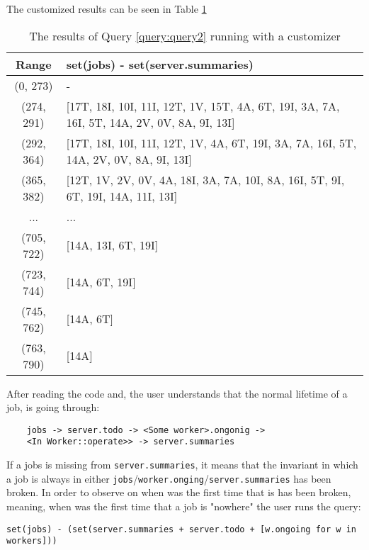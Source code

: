 \documentclass[sigconf,review]{acmart}
\begin{document}
    The customized results can be seen in Table \ref{tab:q2rescus}

    \begin{table}[h]
        \centering
        \begin{tabular}{|c|p{5cm}|}
            \hline
            \textbf{Range} & \textbf{set(jobs) - set(server.summaries)}                                                 \\ \hline
            (0, 273)       & -                                                                                          \\ \hline
            (274, 291)     & [17T, 18I, 10I, 11I, 12T, 1V, 15T, 4A, 6T, 19I, 3A, 7A, 16I, 5T, 14A, 2V, 0V, 8A, 9I, 13I] \\ \hline
            (292, 364)     & [17T, 18I, 10I, 11I, 12T, 1V, 4A, 6T, 19I, 3A, 7A, 16I, 5T, 14A, 2V, 0V, 8A, 9I, 13I]      \\ \hline
            (365, 382)     & [12T, 1V, 2V, 0V, 4A, 18I, 3A, 7A, 10I, 8A, 16I, 5T, 9I, 6T, 19I, 14A, 11I, 13I]           \\ \hline
            ...            & ...                                                                                        \\ \hline
            (705, 722)     & [14A, 13I, 6T, 19I]                                                                        \\ \hline
            (723, 744)     & [14A, 6T, 19I]                                                                             \\ \hline
            (745, 762)     & [14A, 6T]                                                                                  \\ \hline
            (763, 790)     & [14A]                                                                                      \\ \hline
        \end{tabular}
        \caption{The results of Query \protect\ref{query:query2} running with a customizer}
        \label{tab:q2rescus}
    \end{table}

    After reading the code and, the user understands that the normal lifetime of a job, is going through:
    \begin{verbatim}
    jobs -> server.todo -> <Some worker>.ongonig ->
    <In Worker::operate>> -> server.summaries
    \end{verbatim}
    If a jobs is missing from \texttt{server.summaries}, it means that the invariant in which a job is always in either \texttt{jobs}/\texttt{worker.onging}/\texttt{server.summaries} has been broken.
    In order to observe on when was the first time that is has been broken, meaning, when was the first time that a job is "nowhere" the user runs the query:
    \begin{lstlisting}[style={query},label={query:query3}]
    set(jobs) - (set(server.summaries + server.todo + [w.ongoing for w in workers]))
    \end{lstlisting}
\end{document}
